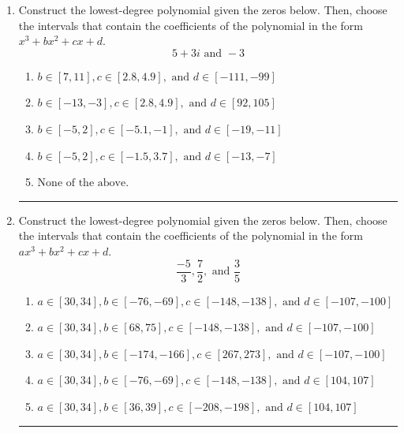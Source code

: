 \documentclass[14pt]{extbook}
\newcommand{\litem}[1]{\item#1\hspace*{-1cm}\rule{\textwidth}{0.4pt}}
\begin{document}
\begin{enumerate}
\litem{
Construct the lowest-degree polynomial given the zeros below. Then, choose the intervals that contain the coefficients of the polynomial in the form $x^3+bx^2+cx+d$.\[ 5 + 3 i \text{ and } -3 \]\begin{enumerate}[label=\Alph*.]
\item \( b \in [7, 11], c \in [2.8, 4.9], \text{ and } d \in [-111, -99] \)
\item \( b \in [-13, -3], c \in [2.8, 4.9], \text{ and } d \in [92, 105] \)
\item \( b \in [-5, 2], c \in [-5.1, -1], \text{ and } d \in [-19, -11] \)
\item \( b \in [-5, 2], c \in [-1.5, 3.7], \text{ and } d \in [-13, -7] \)
\item \( \text{None of the above.} \)

\end{enumerate} }
\litem{
Construct the lowest-degree polynomial given the zeros below. Then, choose the intervals that contain the coefficients of the polynomial in the form $ax^3+bx^2+cx+d$.\[ \frac{-5}{3}, \frac{7}{2}, \text{ and } \frac{3}{5} \]\begin{enumerate}[label=\Alph*.]
\item \( a \in [30, 34], b \in [-76, -69], c \in [-148, -138], \text{ and } d \in [-107, -100] \)
\item \( a \in [30, 34], b \in [68, 75], c \in [-148, -138], \text{ and } d \in [-107, -100] \)
\item \( a \in [30, 34], b \in [-174, -166], c \in [267, 273], \text{ and } d \in [-107, -100] \)
\item \( a \in [30, 34], b \in [-76, -69], c \in [-148, -138], \text{ and } d \in [104, 107] \)
\item \( a \in [30, 34], b \in [36, 39], c \in [-208, -198], \text{ and } d \in [104, 107] \)


\end{enumerate}}
\end{enumerate}
\end{document}
